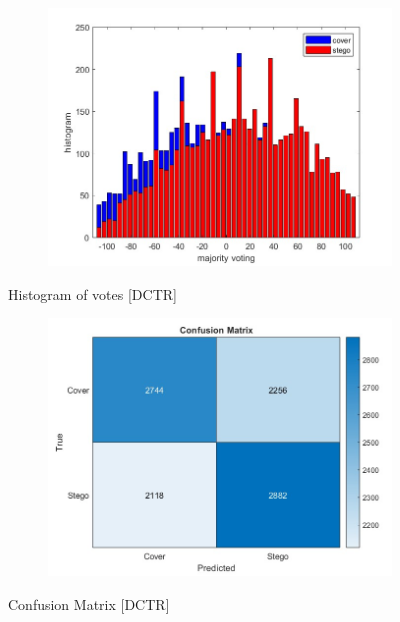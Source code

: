 \begin{figure}[H]
    \centering
    \begin{subfigure}[b]{0.5\textwidth}
        \includegraphics[width=\textwidth]{img/histoDctr.jpg}
    \end{subfigure}
    \caption{Histogram of votes [DCTR]}
\begin{table}[H]
    \centering
        \begin{subfigure}[b]{0.5\textwidth}
            \includegraphics[width=\textwidth]{img/confusiondctr.jpg}
        \end{subfigure}
    \caption{Confusion Matrix [DCTR]}
\end{table}

\end{figure}

